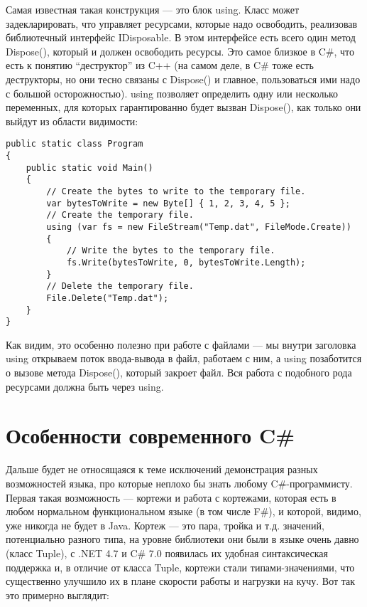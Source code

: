 \documentclass[a5paper]{article}
\begin{document}
Самая известная такая конструкция --- это блок using. Класс может задекларировать, что управляет ресурсами, которые надо освободить, реализовав библиотечный интерфейс IDisposable. В этом интерфейсе есть всего один метод Dispose(), который и должен освободить ресурсы. Это самое близкое в C\#, что есть к понятию ``деструктор'' из C++ (на самом деле, в C\# тоже есть деструкторы, но они тесно связаны с Dispose() и главное, пользоваться ими надо с большой осторожностью). using позволяет определить одну или несколько переменных, для которых гарантированно будет вызван Dispose(), как только они выйдут из области видимости:

\begin{verbatim}
public static class Program 
{
    public static void Main() 
    {
        // Create the bytes to write to the temporary file.
        var bytesToWrite = new Byte[] { 1, 2, 3, 4, 5 };
        // Create the temporary file.
        using (var fs = new FileStream("Temp.dat", FileMode.Create)) 
        {
            // Write the bytes to the temporary file.
            fs.Write(bytesToWrite, 0, bytesToWrite.Length);
        }
        // Delete the temporary file.
        File.Delete("Temp.dat");
    }
}
\end{verbatim}

Как видим, это особенно полезно при работе с файлами --- мы внутри заголовка using открываем поток ввода-вывода в файл, работаем с ним, а using позаботится о вызове метода Dispose(), который закроет файл. Вся работа с подобного рода ресурсами должна быть через using.

\section{Особенности современного C\#}

Дальше будет не относящаяся к теме исключений демонстрация разных возможностей языка, про которые неплохо бы знать любому C\#-программисту. Первая такая возможность --- кортежи и работа с кортежами, которая есть в любом нормальном функциональном языке (в том числе F\#), и которой, видимо, уже никогда не будет в Java. Кортеж --- это пара, тройка и т.д. значений, потенциально разного типа, на уровне библиотеки они были в языке очень давно (класс Tuple), с .NET 4.7 и C\# 7.0 появилась их удобная синтаксическая поддержка и, в отличие от класса Tuple, кортежи стали типами-значениями, что существенно улучшило их в плане скорости работы и нагрузки на кучу. Вот так это примерно выглядит:
\end{document}
